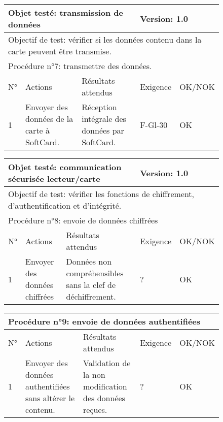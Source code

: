 \documentclass[a4paper,11pt,french]{article}
\begin{document}
\begin{figure}[!h]
\begin{tabular}{|p{1cm}|p{5cm}|p{5cm}|p{2cm}|p{2cm}|}
\hline
\multicolumn{3}{|l|}{Objet testé: transmission de données} & \multicolumn{2}{|l|}{Version: 1.0} \\
\hline
\multicolumn{5}{|l|}{Objectif de test: vérifier si les données contenu dans la carte peuvent être transmise.} \\
\hline
\multicolumn{5}{|l|}{Procédure n°7: transmettre des données.} \\
\hline
N° & Actions & Résultats attendus & Exigence & OK/NOK \\
\hline
1 & Envoyer des données de la carte à SoftCard. & Réception intégrale des données par SoftCard. & F-Gl-30 & OK \\
\hline
\end{tabular}
\end{figure}


\begin{figure}[!h]
\begin{tabular}{|p{1cm}|p{5cm}|p{5cm}|p{2cm}|p{2cm}|}
\hline
\multicolumn{3}{|l|}{Objet testé: communication sécurisée lecteur/carte} & \multicolumn{2}{|l|}{Version: 1.0} \\
\hline
\multicolumn{5}{|l|}{Objectif de test: vérifier les fonctions de chiffrement, d'authentification et d'intégrité.} \\
\hline
\multicolumn{5}{|l|}{Procédure n°8: envoie de données chiffrées} \\
\hline
N° & Actions & Résultats attendus & Exigence & OK/NOK \\
\hline
1 & Envoyer des données chiffrées & Données non compréhensibles sans la clef de déchiffrement. & ? & OK \\
\hline
\end{tabular}
\end{figure}



\begin{figure}[!h]
\begin{tabular}{|p{1cm}|p{5cm}|p{5cm}|p{2cm}|p{2cm}|}
\hline
\multicolumn{5}{|l|}{Procédure n°9: envoie de données authentifiées} \\
\hline
N° & Actions & Résultats attendus & Exigence & OK/NOK \\
\hline
1 & Envoyer des données authentifiées sans altérer le contenu. & Validation de la non modification des données reçues. & ? & OK \\
\hline
\end{tabular}
\end{figure}
\end{document}
